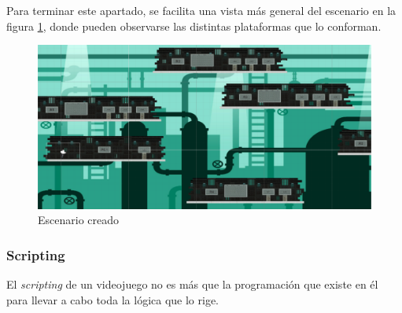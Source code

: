Para terminar este apartado, se facilita una vista más general del escenario en la figura \ref{fig:nivel}, donde pueden observarse las distintas plataformas que lo conforman.

\begin{figure}[h]
  \centering
  \includegraphics[scale=0.175]{imagenes/nivel}
  \caption{Escenario creado}
  \label{fig:nivel}
\end{figure}

\subsubsection{Scripting}
El \textit{scripting} de un videojuego no es más que la programación que existe en él para llevar a cabo toda la lógica que lo rige.
